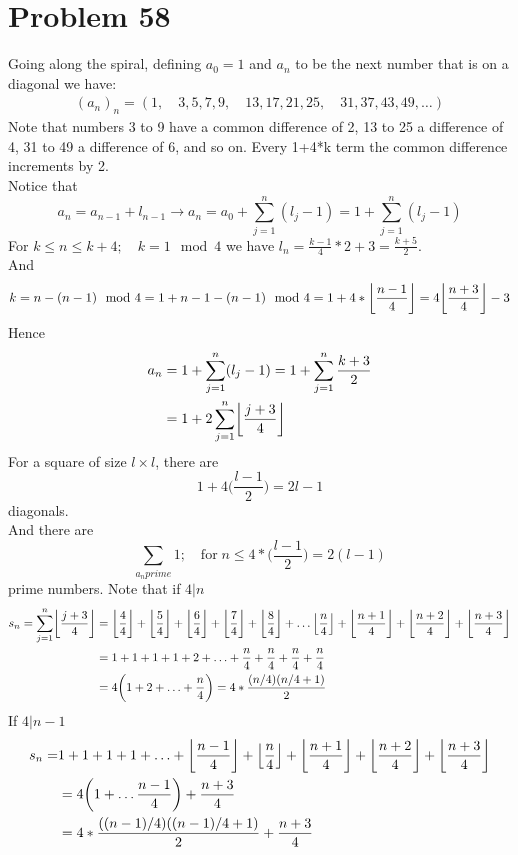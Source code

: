 \documentclass[12pt]{article}
\DeclarePairedDelimiter\floor{\lfloor}{\rfloor}
\begin{document}
\section*{Problem 58}
Going along the spiral, defining $a_0 = 1$ and $a_n$ to be the next number that is on a diagonal we have:
\begin{align*}
    (a_n)_n = (1,\quad 3,5,7,9, \quad 13,17,21,25,\quad 31,37,43,49,\ldots)
\end{align*}
Note that numbers 3 to 9 have a common difference of 2, 13 to 25 a difference of 4, 31 to 49 a difference of 6, and so on. Every 1+4*k term the common difference increments by 2.\\
Notice that
$$
    a_n = a_{n-1} + l_{n-1} \rightarrow a_n = a_0 + \sum_{j=1}^n (l_j-1) = 1 + \sum_{j = 1}^n (l_j-1)
$$
For $k \leq n \leq k+4; \quad k = 1 \mod 4$ we have $l_n = \frac{k-1}{4}*2+3 = \frac{k+5}{2}$.\\
And
$$
    k = n-(n-1)\mod 4 = 1 + n-1 -(n-1) \mod 4 = 1 + 4*\floor*{\frac{n-1}{4}} = 4\floor*{\frac{n+3}{4}}-3
$$
Hence
\begin{align*}
    a_n &= 1+\sum_{j = 1}^n (l_j -1) = 1 + \sum_{j = 1}^n \frac{k+3}{2} \\
    &= 1+2\sum_{j = 1}^n \floor*{\frac{j+3}{4}}
\end{align*}
For a square of size $l \times l$, there are
$$
    1 + 4\Big(\frac{l-1}{2}\Big) = 2l-1
$$
diagonals.\\
And there are
$$
    \sum_{a_n prime} 1; \quad \text{for} \; n \leq 4*\Big(\frac{l-1}{2}\Big) = 2(l-1)
$$
prime numbers.
Note that if $4|n$
\begin{align*}
    s_n = \sum_{j = 1}^n \floor*{\frac{j+3}{4}} &= \floor*{\frac{4}{4}} + \floor*{\frac{5}{4}} + \floor*{\frac{6}{4}} + \floor*{\frac{7}{4}} +
    \floor*{\frac{8}{4}} + \ldots \floor*{\frac{n}{4}} +\floor*{\frac{n+1}{4}} +\floor*{\frac{n+2}{4}} +\floor*{\frac{n+3}{4}}\\
    &= 1 +1+1+1+2+\ldots +\frac{n}{4}+\frac{n}{4}+\frac{n}{4}+\frac{n}{4}\\
    &= 4\bigg(1 + 2+ \ldots + \frac{n}{4} \bigg) = 4*  \frac{(n/4) (n/4+1)}{2}
\end{align*}
If $4|n-1$
\begin{align*}
    s_n =& 1+1+1+1+\ldots + \floor*{\frac{n-1}{4}}+\floor*{\frac{n}{4}}+\floor*{\frac{n+1}{4}}+\floor*{\frac{n+2}{4}}+\floor*{\frac{n+3}{4}} \\
    &= 4\bigg(1+\ldots \frac{n-1}{4}\bigg) + \frac{n+3}{4} \\
    &= 4* \frac{((n-1)/4)((n-1)/4+1)}{2} + \frac{n+3}{4}
\end{align*}
\end{document}
